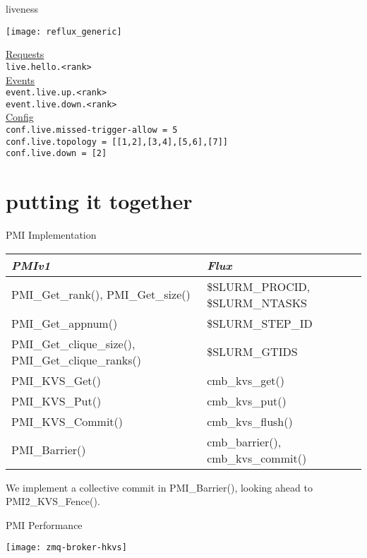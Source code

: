 \documentclass[default,pdf,colorBG,slideColor]{prosper}
\begin{document}
\begin{slide}{liveness}{\tiny
\begin{center}
  \texttt{[image: reflux\_generic]}
\end{center}
\underline{Requests}\\
{\tt live.hello.<rank>}\\
\underline{Events}\\
{\tt event.live.up.<rank>}\\
{\tt event.live.down.<rank>}\\
\underline{Config}\\
{\tt conf.live.missed-trigger-allow = 5}\\
{\tt conf.live.topology = [[1,2],[3,4],[5,6],[7]]}\\
{\tt conf.live.down = [2]}\\
}\end{slide}

\part{putting it together}

\begin{slide}{PMI Implementation}{\tiny
\begin{tabular}{|l|l|}
\hline
{\em PMIv1} & {\em Flux}\\
\hline
PMI\_Get\_rank(), PMI\_Get\_size() & \$SLURM\_PROCID, \$SLURM\_NTASKS\\
PMI\_Get\_appnum() & \$SLURM\_STEP\_ID\\
PMI\_Get\_clique\_size(), PMI\_Get\_clique\_ranks() & \$SLURM\_GTIDS\\
\hline
PMI\_KVS\_Get()    & cmb\_kvs\_get()\\
PMI\_KVS\_Put()    & cmb\_kvs\_put()\\
PMI\_KVS\_Commit() & cmb\_kvs\_flush()\\
PMI\_Barrier()     & cmb\_barrier(), cmb\_kvs\_commit()\\
\hline
\end{tabular}
We implement a collective commit in PMI\_Barrier(),
looking ahead to PMI2\_KVS\_Fence().
}\end{slide}

\begin{slide}{PMI Performance}{\small
\begin{center}
  \texttt{[image: zmq-broker-hkvs]}
\end{center}
}\end{slide}
\end{document}
